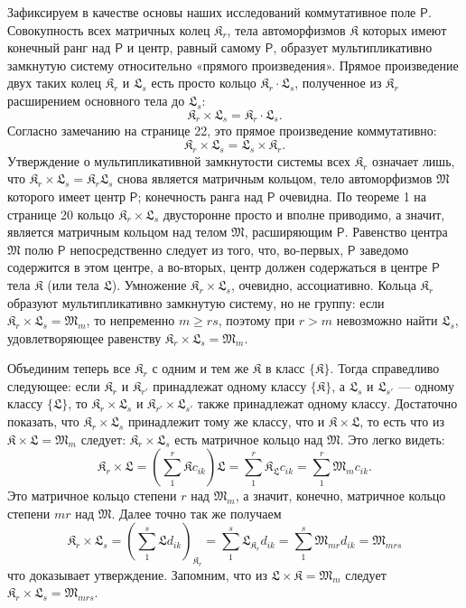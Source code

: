 \documentclass[11pt]{article}
\begin{document}
Зафиксируем в качестве основы наших исследований коммутативное поле \(\mathsf P\). Совокупность всех матричных колец \(\mathfrak K_r\), тела автоморфизмов \(\mathfrak K\) которых имеют конечный ранг над \(\mathsf P\) и центр, равный самому \(\mathsf P\), образует мультипликативно замкнутую систему относительно «прямого произведения». Прямое произведение двух таких колец \(\mathfrak K_r\) и \(\mathfrak L_s\) есть просто кольцо \(\mathfrak K_r\cdot\mathfrak L_s\), полученное из \(\mathfrak K_r\) расширением основного тела до \(\mathfrak L_s\):
\[
\mathfrak K_r\times\mathfrak L_s=\mathfrak K_r\cdot\mathfrak L_s.
\]
Согласно замечанию на странице 22, это прямое произведение коммутативно:
\[
\mathfrak K_r\times\mathfrak L_s=\mathfrak L_s\times\mathfrak K_r.
\]
Утверждение о мультипликативной замкнутости системы всех \(\mathfrak K_r\) означает лишь, что \(\mathfrak K_r\times\mathfrak L_s=\mathfrak K_r\mathfrak L_s\) снова является матричным кольцом, тело автоморфизмов \(\mathfrak M\) которого имеет центр \(\mathsf P\); конечность ранга над \(\mathsf P\) очевидна. По теореме 1 на странице 20 кольцо \(\mathfrak K_r\times\mathfrak L_s\) двусторонне просто и вполне приводимо, а значит, является матричным кольцом над телом \(\mathfrak M\), расширяющим \(\mathsf P\). Равенство центра \(\mathfrak M\) полю \(\mathsf P\) непосредственно следует из того, что, во-первых, \(\mathsf P\) заведомо содержится в этом центре, а во-вторых, центр должен содержаться в центре \(\mathsf P\) тела \(\mathfrak K\) (или тела \(\mathfrak L\)). Умножение \(\mathfrak K_r\times\mathfrak L_s\), очевидно, ассоциативно. Кольца \(\mathfrak K_r\) образуют мультипликативно замкнутую систему, но не группу: если \(\mathfrak K_r\times\mathfrak L_s=\mathfrak M_m\), то непременно \(m\geq rs\), поэтому при \(r>m\) невозможно найти \(\mathfrak L_s\), удовлетворяющее равенству \(\mathfrak K_r\times\mathfrak L_s=\mathfrak M_m\).

Объединим теперь все \(\mathfrak K_r\) с одним и тем же \(\mathfrak K\) в класс \(\{\mathfrak K\}\). Тогда справедливо следующее: если \(\mathfrak K_r\) и \(\mathfrak K_{r'}\) принадлежат одному классу \(\{\mathfrak K\}\), а \(\mathfrak L_s\) и \(\mathfrak L_{s'}\) --- одному классу \(\{\mathfrak L\}\), то \(\mathfrak K_r\times\mathfrak L_s\) и \(\mathfrak K_{r'}\times\mathfrak L_{s'}\) также принадлежат одному классу. Достаточно показать, что \(\mathfrak K_r\times\mathfrak L_s\) принадлежит тому же классу, что и \(\mathfrak K\times\mathfrak L\), то есть что из \(\mathfrak K\times\mathfrak L=\mathfrak M_m\) следует: \(\mathfrak K_r\times\mathfrak L_s\) есть матричное кольцо над \(\mathfrak M\). Это легко видеть:
\[
\mathfrak K_r\times\mathfrak L
=\left(\sum_1^r\mathfrak K c_{ik}\right)\mathfrak L
=\sum_1^r\mathfrak K_{\mathfrak L}c_{ik}
=\sum_1^r\mathfrak M_m c_{ik}.
\]
Это матричное кольцо степени \(r\) над \(\mathfrak M_m\), а значит, конечно, матричное кольцо степени \(mr\) над \(\mathfrak M\). Далее точно так же получаем
\[
\mathfrak K_r\times\mathfrak L_s
=\left(\sum_1^s\mathfrak L d_{ik}\right)_{\mathfrak K_r}
=\sum_1^s\mathfrak L_{\mathfrak K_r}d_{ik}
=\sum_1^s\mathfrak M_{mr}d_{ik}
=\mathfrak M_{mrs}
\]
что доказывает утверждение. Запомним, что из \(\mathfrak L\times\mathfrak K=\mathfrak M_m\) следует \(\mathfrak K_r\times\mathfrak L_s=\mathfrak M_{mrs}\).
\end{document}
